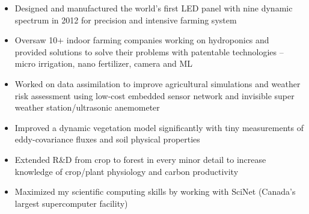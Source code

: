 \documentclass[10pt,a4paper,ragged2e,withhyper]{altacv}
\begin{document}
\begin{paracol}{2}
\begin{itemize}
\item Designed and manufactured the world's first LED panel with nine dynamic spectrum in 2012 for precision and intensive farming system
\item Oversaw 10+ indoor farming companies working on hydroponics and provided solutions to solve their problems with patentable technologies -- micro irrigation, nano fertilizer, camera and ML
\item Worked on data assimilation to improve agricultural simulations and weather risk assessment using low-cost embedded sensor network and invisible super weather station/ultrasonic anemometer    
\end{itemize}

\divider

\begin{itemize}
\item Improved a dynamic vegetation model significantly with tiny measurements of eddy-covariance fluxes and soil physical properties
\item Extended R\&D from crop to forest in every minor detail to increase knowledge of crop/plant physiology and carbon productivity
\item Maximized my scientific computing skills by working with SciNet (Canada's largest supercomputer facility)
\end{itemize}





\medskip






\nocite{*}

\printbibliography[heading=pubtype,title={\printinfo{\faBook}{Thesis}},type=book]


\end{paracol}
\end{document}
